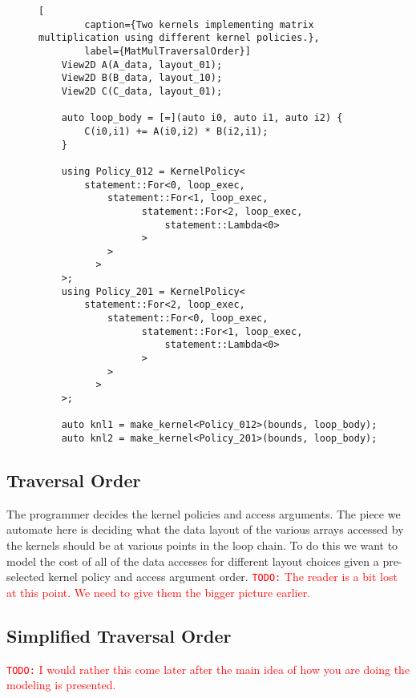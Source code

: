 \documentclass[sigconf, table]{acmart}
\newcommand{\todo}[1]{{\textcolor{red}{{\tt{TODO:}}\,\,#1 }}}
\begin{document}
\begin{figure}
	\begin{lstlisting}[
		caption={Two kernels implementing matrix multiplication using different kernel policies.},
		label={MatMulTraversalOrder}]
	View2D A(A_data, layout_01);
	View2D B(B_data, layout_10);
	View2D C(C_data, layout_01);
	
	auto loop_body = [=](auto i0, auto i1, auto i2) {
		C(i0,i1) += A(i0,i2) * B(i2,i1);
	}
	
	using Policy_012 = KernelPolicy<
		statement::For<0, loop_exec,
			statement::For<1, loop_exec,
				  statement::For<2, loop_exec,
					  statement::Lambda<0>
				  >
			>
		  >
	>;
	using Policy_201 = KernelPolicy<
		statement::For<2, loop_exec,
			statement::For<0, loop_exec,
				  statement::For<1, loop_exec,
					  statement::Lambda<0>
				  >
			>
		  >
	>;
	
	auto knl1 = make_kernel<Policy_012>(bounds, loop_body);
	auto knl2 = make_kernel<Policy_201>(bounds, loop_body);
	\end{lstlisting}
\end{figure}


\subsection{Traversal Order}

The programmer decides the kernel policies and access arguments.
The piece we automate here is deciding what the data layout of the various arrays accessed by
the kernels should be at various points in the loop chain.
To do this we want to model the cost of all of the data accesses for different layout choices
given a pre-selected kernel policy and access argument order.
\todo{The reader is a bit lost at this point.  We need to give them the bigger picture earlier.}



\subsection{Simplified Traversal Order}

\todo{I would rather this come later after the main idea of how you are doing the modeling is presented.}
\end{document}
